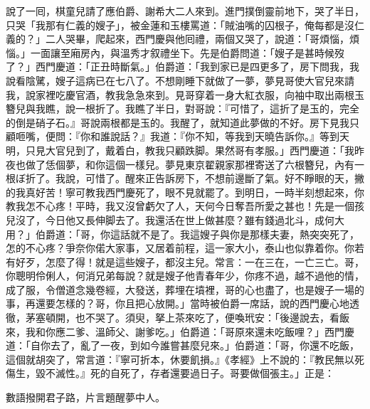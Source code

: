 說了一囘，棋童兒請了應伯爵、謝希大二人來到。進門撲倒靈前地下，{}哭了半日，只哭「我那有仁義的嫂子」，{}被金蓮和玉樓罵道：「賊油嘴的囚根子，俺每都是沒仁義的？」二人哭畢，爬起來，西門慶與他囘禮，兩個又哭了，說道：「哥煩惱，煩惱。」一面讓至廂房內，與溫秀才叙禮坐下。先是伯爵問道：「嫂子是甚時候歿了？」西門慶道：「正丑時斷氣。」伯爵道：「我到家已是四更多了，房下問我，我說看陰騭，嫂子這病已在七八了。不想剛睡下就做了一夢，{}夢見哥使大官兒來請我，說家裡吃慶官酒，教我急急來到。見哥穿着一身大紅衣服，向袖中取出兩根玉簪兒與我瞧，說一根折了。我瞧了半日，對哥說：『可惜了，這折了是玉的，完全的倒是硝子石。』{}哥說兩根都是玉的。{}我醒了，就知道此夢做的不好。房下見我只顧咂嘴，便問：『你和誰說話？』我道：『你不知，等我到天曉告訴你。』等到天明，只見大官兒到了，戴着白，教我只顧跌脚。{}果然哥有孝服。」西門慶道：「我昨夜也做了恁個夢，和你這個一樣兒。夢見東京翟親家那裡寄送了六根簪兒，內有一根ぼ折了。我說，可惜了。醒來正告訴房下，不想前邊斷了氣。好不睜眼的天，{}撇的我真好苦！寧可教我西門慶死了，眼不見就罷了。到明日，一時半刻想起來，你教我怎不心疼！平時，我又沒曾虧欠了人，{}天何今日奪吾所愛之甚也！先是一個孩兒沒了，今日他又長伸脚去了。我還活在世上做甚麼？雖有錢過北斗，成何大用？」伯爵道：「哥，你這話就不是了。我這嫂子與你是那樣夫妻，熱突突死了，怎的不心疼？爭奈你偌大家事，又居着前程，這一家大小，泰山也似靠着你。你若有好歹，怎麼了得！就是這些嫂子，都沒主兒。常言：一在三在，一亡三亡。哥，你聰明伶俐人，何消兄弟每說？就是嫂子他青春年少，你疼不過，越不過他的情，成了服，令僧道念幾卷經，大發送，葬埋在墳裡，哥的心也盡了，也是嫂子一場的事，再還要怎樣的？哥，你且把心放開。」{}當時被伯爵一席話，說的西門慶心地透徹，茅塞頓開，也不哭了。須臾，拏上茶來吃了，便喚玳安：「後邊說去，看飯來，我和你應二爹、溫師父、謝爹吃。」伯爵道：「哥原來還未吃飯哩？」西門慶道：「自你去了，亂了一夜，到如今誰嘗甚麼兒來。」伯爵道：「哥，你還不吃飯，這個就胡突了，常言道：『寧可折本，休要飢損。』《孝經》上不說的：『教民無以死傷生，毀不滅性。』{}死的自死了，存者還要過日子。哥要做個張主。」正是：

\begin{myquote} 
數語撥開君子路，片言題醒夢中人。
\end{myquote} 

